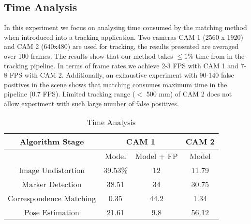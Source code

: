 \documentclass{bmvc2k}
\begin{document}
\subsection{Time Analysis}
In this experiment we focus on analysing time consumed by the matching method when introduced into a tracking application. 
Two cameras CAM 1 (2560 x 1920) and CAM 2 (640x480) are used for tracking, the results presented are averaged over 100 frames. 
The results show that our method takes $ \leq 1\% $ time from in the tracking pipeline. In terms of frame rates we achieve 2-3 FPS with CAM 1 and 7-8 FPS with CAM 2. Additionally, an exhaustive experiment with 90-140 false positives in the scene shows that matching consumes maximum time in the pipeline (0.7 FPS). Limited tracking range ($<$ 500 mm) of CAM 2 does not allow experiment with such large number of false positives. 
\begin{table}
\caption{Time Analysis}\label{table:trackPerformance}
\centering
\begin{tabular}{|c | c | c | c |}
\hline 
Algorithm Stage & \multicolumn{2}{|c|}{CAM 1} & CAM 2\\ \hline
{} & Model & Model + FP & Model \\ \hline 
Image Undistortion & 39.53\% & 12 & 11.79 \\
Marker Detection & 38.51 & 34 & 30.75 \\
Correspondence Matching & 0.35 & 44.2 & 1.34 \\
Pose Estimation & 21.61 & 9.8 & 56.12 \\ \hline
\end{tabular}
\end{table}
\end{document}
